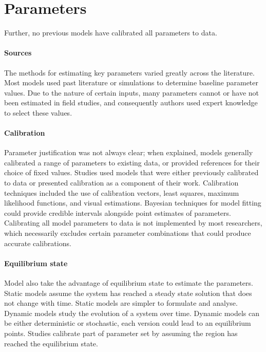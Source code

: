 \documentclass[a4paper, 12pt, twoside]{article}
\begin{document}
\section{Parameters}
Further, no previous models have calibrated all parameters to data.

\paragraph{Sources}%
\label{par:sources}
The methods for estimating key parameters varied greatly across the literature.
Most models used past literature or simulations to determine baseline parameter values.
Due to the nature of certain inputs, many parameters cannot or have not been estimated in field studies, and consequently authors used expert knowledge to select these values.

\paragraph{Calibration}%
\label{par:calibration}
Parameter justification was not always clear\cite{Gurarie2007,Arifin2011a,NiazArifin2013}; when explained, models generally calibrated a range of parameters to existing data, or provided references for their choice of fixed values.
Studies used models that were either previously calibrated to data or presented calibration as a component of their work.
Calibration techniques included the use of calibration vectors, least squares, maximum likelihood functions, and visual estimations.
Bayesian techniques for model fitting could provide credible intervals alongside point estimates of parameters.
Calibrating all model parameters to data is not implemented by most researchers, which necessarily excludes certain parameter combinations that could produce accurate calibrations.

\paragraph{Equilibrium state}%
\label{par:equilibrium_state}
Model also take the advantage of equilibrium state to estimate the parameters\cite{Alves2021}.
Static models assume the system has reached a steady state solution that does not change with time.
Static models are simpler to formulate and analyse.
Dynamic models study the evolution of a system over time.
Dynamic models can be either deterministic or stochastic, each version could lead to an equilibrium points.
Studies calibrate part of parameter set by assuming the region has reached the equilibrium state.
\end{document}
